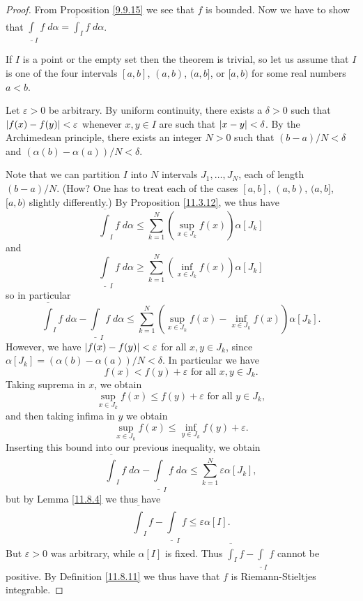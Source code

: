 \begin{proof}
    From Proposition \ref{9.9.15} we see that \(f\) is bounded.
    Now we have to show that \(\underline{\int}_I f \; d \alpha = \overline{\int}_I f \; d \alpha\).

    If \(I\) is a point or the empty set then the theorem is trivial, so let us assume that \(I\) is one of the four intervals \([a, b]\), \((a, b)\), \((a, b]\), or \([a, b)\) for some real numbers \(a < b\).

            Let \(\varepsilon > 0\) be arbitrary.
            By uniform continuity, there exists a \(\delta > 0\) such that \(\abs*{f(x) - f(y)} < \varepsilon\) whenever \(x, y \in I\) are such that \(\abs*{x - y} < \delta\).
            By the Archimedean principle, there exists an integer \(N > 0\) such that \((b - a) / N < \delta\) and \((\alpha(b) - \alpha(a)) / N < \delta\).

            Note that we can partition \(I\) into \(N\) intervals \(J_1, \dots, J_N\), each of length \((b - a) / N\).
            (How? One has to treat each of the cases \([a, b]\), \((a, b)\), \((a, b]\), \([a, b)\) slightly differently.)
    By Proposition \ref{11.3.12}, we thus have
    \[
        \overline{\int}_I f \; d \alpha \leq \sum_{k = 1}^N (\sup_{x \in J_k} f(x)) \alpha[J_k]
    \]
    and
    \[
        \underline{\int}_I f \; d \alpha \geq \sum_{k = 1}^N (\inf_{x \in J_k} f(x)) \alpha[J_k]
    \]
    so in particular
    \[
        \overline{\int}_I f \; d \alpha - \underline{\int}_I f \; d \alpha \leq \sum_{k = 1}^N (\sup_{x \in J_k} f(x) - \inf_{x \in J_k} f(x)) \alpha[J_k].
    \]
    However, we have \(\abs*{f(x) - f(y)} < \varepsilon\) for all \(x, y \in J_k\), since \(\alpha[J_k] = (\alpha(b) - \alpha(a)) / N < \delta\).
    In particular we have
    \[
        f(x) < f(y) + \varepsilon \text{ for all } x, y \in J_k.
    \]
    Taking suprema in \(x\), we obtain
    \[
        \sup_{x \in J_k} f(x) \leq f(y) + \varepsilon \text{ for all } y \in J_k,
    \]
    and then taking infima in \(y\) we obtain
    \[
        \sup_{x \in J_k} f(x) \leq \inf_{y \in J_k} f(y) + \varepsilon.
    \]
    Inserting this bound into our previous inequality, we obtain
    \[
        \overline{\int}_I f \; d \alpha - \underline{\int}_I f \; d \alpha \leq \sum_{k = 1}^N \varepsilon \alpha[J_k],
    \]
    but by Lemma \ref{11.8.4} we thus have
    \[
        \overline{\int}_I f - \underline{\int}_I f \leq \varepsilon \alpha[I].
    \]
    But \(\varepsilon > 0\) was arbitrary, while \(\alpha[I]\) is fixed.
    Thus \(\overline{\int}_I f - \underline{\int}_I f\) cannot be positive.
    By Definition \ref{11.8.11} we thus have that \(f\) is Riemann-Stieltjes integrable.
\end{proof}

